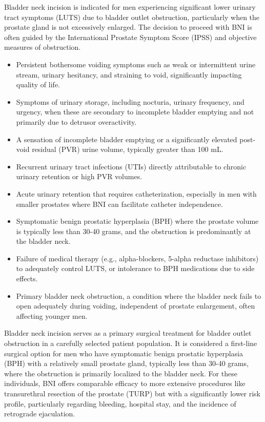 Bladder neck incision is indicated for men experiencing significant lower urinary tract symptoms (LUTS) due to bladder outlet obstruction, particularly when the prostate gland is not excessively enlarged. The decision to proceed with BNI is often guided by the International Prostate Symptom Score (IPSS) and objective measures of obstruction.

\begin{itemize}
  \item Persistent bothersome voiding symptoms such as weak or intermittent urine stream, urinary hesitancy, and straining to void, significantly impacting quality of life.
  \item Symptoms of urinary storage, including nocturia, urinary frequency, and urgency, when these are secondary to incomplete bladder emptying and not primarily due to detrusor overactivity.
  \item A sensation of incomplete bladder emptying or a significantly elevated post-void residual (PVR) urine volume, typically greater than 100 mL.
  \item Recurrent urinary tract infections (UTIs) directly attributable to chronic urinary retention or high PVR volumes.
  \item Acute urinary retention that requires catheterization, especially in men with smaller prostates where BNI can facilitate catheter independence.
  \item Symptomatic benign prostatic hyperplasia (BPH) where the prostate volume is typically less than 30-40 grams, and the obstruction is predominantly at the bladder neck.
  \item Failure of medical therapy (e.g., alpha-blockers, 5-alpha reductase inhibitors) to adequately control LUTS, or intolerance to BPH medications due to side effects.
  \item Primary bladder neck obstruction, a condition where the bladder neck fails to open adequately during voiding, independent of prostate enlargement, often affecting younger men.
\end{itemize}

Bladder neck incision serves as a primary surgical treatment for bladder outlet obstruction in a carefully selected patient population. It is considered a first-line surgical option for men who have symptomatic benign prostatic hyperplasia (BPH) with a relatively small prostate gland, typically less than 30-40 grams, where the obstruction is primarily localized to the bladder neck. For these individuals, BNI offers comparable efficacy to more extensive procedures like transurethral resection of the prostate (TURP) but with a significantly lower risk profile, particularly regarding bleeding, hospital stay, and the incidence of retrograde ejaculation.

